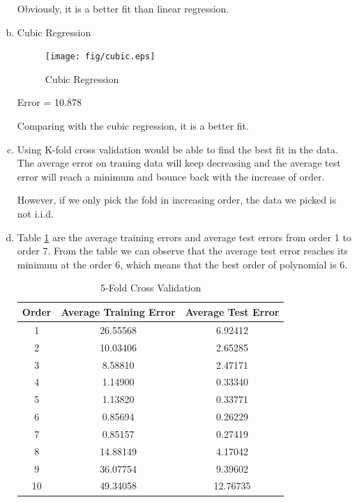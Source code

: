 \documentclass[a4paper, 12pt, titlepage]{article}
\begin{document}
\begin{enumerate}[(a)]
            Obviously, it is a better fit than linear regression.

        \item Cubic Regression %
            \begin{figure}[H]
                \centering
                \texttt{[image: fig/cubic.eps]}
                \caption{Cubic Regression}\label{f}
            \end{figure}

            Error = 10.878

            Comparing with the cubic regression, it is a better fit.

        \item %
            Using K-fold cross validation would be able to find the best fit in the data. The average error on traning data will keep decreasing and the average test error will reach a minimum and bounce back with the increase of order.

            However, if we only pick the fold in increasing order, the data we picked is not i.i.d.

        \item Table \ref{CrossValid} are the average training errors and average test errors from order 1 to order 7. From the table we can observe that the average test error reaches its minimum at the order 6, which means that the best order of polynomial is 6.
            \begin{table}[H]
                \centering
                \begin{tabular}{ccc}
                Order & Average Training Error & Average Test Error \\
                    \hline
                1 & 26.55568 & 6.92412 \\
                2 & 10.03406 & 2.65285 \\
                3 & 8.58810  & 2.47171 \\
                4 & 1.14900  & 0.33340 \\
                5 & 1.13820  & 0.33771 \\
                6 & 0.85694  & 0.26229 \\
                7 & 0.85157  & 0.27419 \\
                8 & 14.88149  & 4.17042\\
                9 & 36.07754  & 9.39602 \\
                10 & 49.34058  & 12.76735 \\
                \end{tabular}
                \caption{5-Fold Cross Validation}
                \label{CrossValid}
            \end{table}


\end{enumerate}
\end{document}
